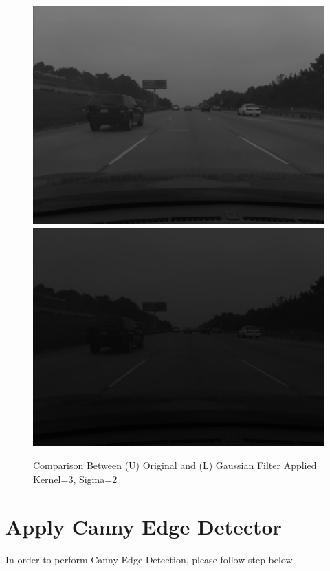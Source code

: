 \documentclass[12pt,a4paper]{report}
\begin{document}
\begin{figure}[!htb]
  \centering
  \includegraphics[height=0.4\paperheight]{output/img2_q1_K3_SIG_1.0.png}
  \includegraphics[height=0.4\paperheight]{output/img2_q1_K3_SIG_2.0.png}
  \caption{Comparison Between (U) Original and (L) Gaussian Filter Applied Kernel=3, Sigma=2}
\end{figure}
\clearpage


\section{Apply Canny Edge Detector}
In order to perform Canny Edge Detection, please follow step below
\end{document}
